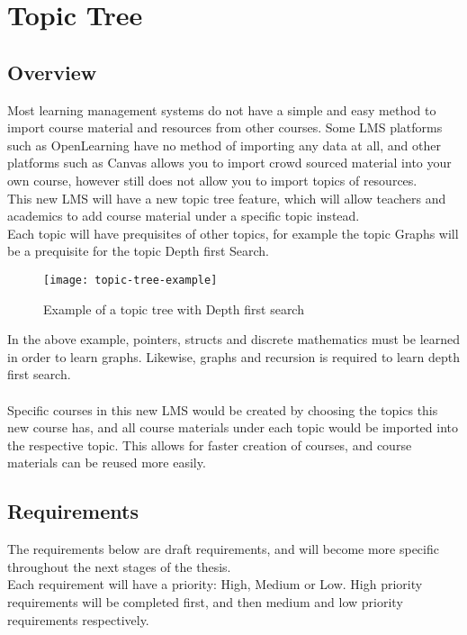 \section{Topic Tree}
\subsection{Overview}
Most learning management systems do not have a simple and easy method to import course material and resources from other courses. Some LMS platforms such as OpenLearning have no method of importing any data at all, and other platforms such as Canvas allows you to import crowd sourced material into your own course, however still does not allow you to import topics of resources. \\

This new LMS will have a new topic tree feature, which will allow teachers and academics to add course material under a specific topic instead.\\
Each topic will have prequisites of other topics, for example the topic Graphs will be a prequisite for the topic Depth first Search.\\

\begin{figure}[h!]
    \centering
    \texttt{[image: topic-tree-example]}
    \caption{Example of a topic tree with Depth first search}
\end{figure}

In the above example, pointers, structs and discrete mathematics must be learned in order to learn graphs. Likewise, graphs and recursion is required to learn depth first search.\\
\\
Specific courses in this new LMS would be created by choosing the topics this new course has, and all course materials under each topic would be imported into the respective topic. This allows for faster creation of courses, and course materials can be reused more easily.\\

\subsection{Requirements}
The requirements below are draft requirements, and will become more specific throughout the next stages of the thesis.\\
Each requirement will have a priority: High, Medium or Low. High priority requirements will be completed first, and then medium and low priority requirements respectively. \\

